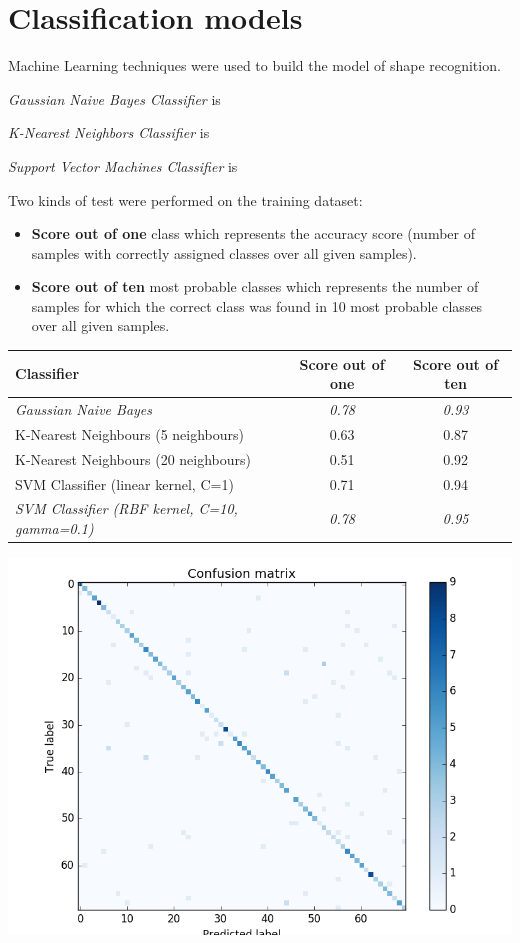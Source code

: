 \documentclass[12pt]{article}
\begin{document}
\section{Classification models}

Machine Learning techniques were used to build the model of shape recognition.  

\textit{Gaussian Naive Bayes Classifier} is

\textit{K-Nearest Neighbors Classifier} is

\textit{Support Vector Machines Classifier} is

Two kinds of test were performed on the training dataset:
\begin{itemize}
	\item \textbf{Score out of one} class which represents the accuracy score (number of samples with correctly assigned classes over all given samples).
	\item \textbf{Score out of ten} most probable classes which represents the number of samples for which the correct class was found in 10 most probable classes over all given samples.
\end{itemize}

\begin{center}
  \begin{tabular}{| l | c | c |}
    \hline
    \textbf{Classifier} & \textbf{Score out of one} & \textbf{Score out of ten}\\ \hline \hline
    \textit{Gaussian Naive Bayes} & \textit{0.78} & \textit{0.93} \\ \hline
	K-Nearest Neighbours (5 neighbours) & 0.63 & 0.87\\ \hline
	K-Nearest Neighbours (20 neighbours) & 0.51 & 0.92 \\ \hline
	SVM Classifier (linear kernel, C=1) & 0.71 & 0.94 \\ \hline
	\textit{SVM Classifier (RBF kernel, C=10, gamma=0.1)} & \textit{0.78} & \textit{0.95} \\ 
	\hline
  \end{tabular}
\end{center}

\includegraphics[scale=0.6]{confusion_matrix.png} 
\end{document}
